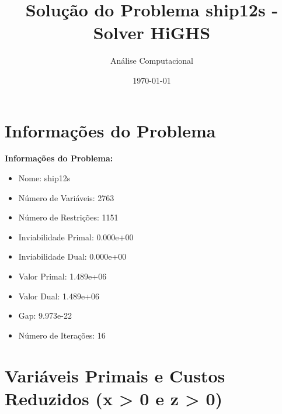 \documentclass[12pt]{article}
\title{Solução do Problema ship12s - Solver HiGHS}
\author{Análise Computacional}
\date{\today}
\begin{document}
\maketitle

\section{Informações do Problema}

\textbf{Informações do Problema:}
\begin{itemize}
\item Nome: ship12s
\item Número de Variáveis: 2763
\item Número de Restrições: 1151
\item Inviabilidade Primal: 0.000e+00
\item Inviabilidade Dual: 0.000e+00
\item Valor Primal: 1.489e+06
\item Valor Dual: 1.489e+06
\item Gap: 9.973e-22
\item Número de Iterações: 16
\end{itemize}


\section{Variáveis Primais e Custos Reduzidos (x > 0 e z > 0)}
\end{document}
